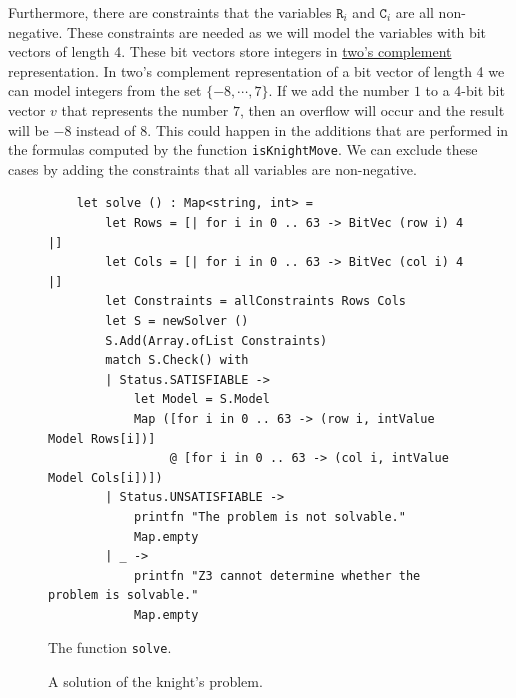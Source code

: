\begin{enumerate}
      Furthermore, there are constraints that the variables $\mathtt{R}_i$ and $\mathtt{C}_i$ are all
      non-negative.  These constraints are needed as we will model the variables with bit vectors of length 4.
      These bit vectors store integers in
      \href{https://en.wikipedia.org/wiki/Two%27s_complement}{two's complement} representation.
      In two's complement representation of a bit vector of length 4 we can model integers from the set
      $\{-8, \cdots, 7\}$.  If we add the number $1$ to a 4-bit bit vector $v$ that represents the number $7$,
      then an overflow will occur and the result will be $-8$ instead of $8$. This could happen in the
      additions that are performed in the formulas computed by the function \texttt{isKnightMove}.
      We can exclude these cases by adding the constraints that all variables are non-negative.
\end{enumerate}

\begin{figure}[!ht]
\centering
\begin{verbatim}
    let solve () : Map<string, int> =
        let Rows = [| for i in 0 .. 63 -> BitVec (row i) 4 |]
        let Cols = [| for i in 0 .. 63 -> BitVec (col i) 4 |]
        let Constraints = allConstraints Rows Cols
        let S = newSolver ()
        S.Add(Array.ofList Constraints)
        match S.Check() with
        | Status.SATISFIABLE ->
            let Model = S.Model
            Map ([for i in 0 .. 63 -> (row i, intValue Model Rows[i])]
                 @ [for i in 0 .. 63 -> (col i, intValue Model Cols[i])])
        | Status.UNSATISFIABLE ->
            printfn "The problem is not solvable."
            Map.empty
        | _ ->
            printfn "Z3 cannot determine whether the problem is solvable."
            Map.empty
\end{verbatim}
\vspace*{-0.3cm}
\caption{The function \texttt{solve}.}
\label{fig:Knight's Tour with Z3.ipynb-2}
\end{figure}

\begin{figure}[!ht]
  \centering
  \caption{A solution of the knight's problem.}
  \label{fig:knights-problem.png}
\end{figure}

